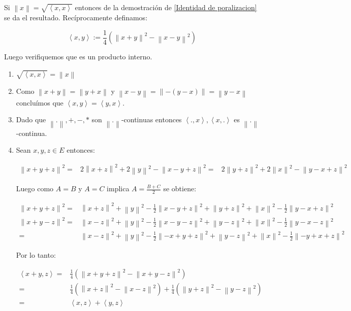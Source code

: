 \documentclass[11pt]{article}
\newcommand{\norm}[1]{\left\lVert#1\right\rVert}
\newcommand{\ip}[1]{\left\langle#1\right\rangle}
\numberwithin{theorem}{subsection}
\newenvironment{proof}[1][Demostraci\'on]{\begin{trivlist}
		\item[\hskip \labelsep {\bfseries #1}]}{\end{trivlist}}
\begin{document}
\begin{proof}
	Si $\norm{x} = \sqrt{\ip{x,x}}$ entonces de la demostraci\'on de \ref{Identidad de poralizacion} se da el resultado. Rec\'iprocamente definamos:
	
	 $$ \ip{x,y} := \frac{1}{4}\left(\norm{x+y}^2 - \norm{x-y}^2\right)$$
	
	Luego verifiquemos que es un producto interno.
	
	\begin{enumerate}
		\item $\sqrt{\ip{x,x}} = \norm{x}$
		\item Como $\norm{x+y} = \norm{y+x}$ y $\norm{x-y} = \norm{-(y-x)} = \norm{y-x}$ conclu\'imos que $\ip{x,y} = \ip{y,x}$.
		\item Dado que $\norm{.}, +, -, *$ son $\norm{.}$-continuas entonces $\ip{.,x},\ip{x,.}$ es $\norm{.}$-continua.
		\item Sean $x,y,z \in E$ entonces:
		
		\[
		\begin{aligned}
			\norm{x+y+z}^2 = & 2\norm{x+z}^2 + 2\norm{y}^2 - \norm{x-y+z}^2
						   = & 2\norm{y+z}^2 + 2\norm{x}^2 - \norm{y - x+z}^2
		\end{aligned}
		\]
		
		Luego como $A=B$ y $A=C$ implica $A=\frac{B+C}{2}$ se obtiene:
		
		\[
		\begin{aligned}
			\norm{x+y+z}^2 = & \norm{x+z}^2 + \norm{y}^2 - \frac{1}{2}\norm{x-y+z}^2 + \norm{y+z}^2 + \norm{x}^2 - \frac{1}{2}\norm{y - x+z}^2 \\
			\norm{x+y-z}^2 = & \norm{x-z}^2 + \norm{y}^2 - \frac{1}{2}\norm{x-y-z}^2 + \norm{y-z}^2 + \norm{x}^2 - \frac{1}{2}\norm{y - x-z}^2 \\
						   = & \norm{x-z}^2 + \norm{y}^2 - \frac{1}{2}\norm{-x+y+z}^2 + \norm{y-z}^2 + \norm{x}^2 - \frac{1}{2}\norm{-y + x+z}^2 
		\end{aligned}
		\]
		
		Por lo tanto:
		
		\[
			\begin{aligned}
				\ip{x+y,z} = & \frac{1}{4} \left(\norm{x+y+z}^2 - \norm{x+y-z}^2\right) \\
						   = & \frac{1}{4} \left(\norm{x+z}^2 - \norm{x-z}^2\right) + \frac{1}{4} \left(\norm{y+z}^2 - \norm{y-z}^2\right) \\
						   = & \ip{x,z} + \ip{y,z}
			\end{aligned}
		\]
		

\end{enumerate}
\end{proof}
\end{document}
